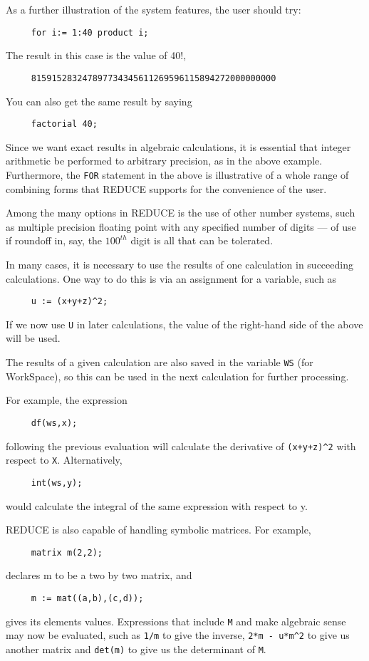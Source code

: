 \documentclass[11pt,letterpaper]{book}
\makeatletter
\newcommand{\REDUCE}{REDUCE}
\newcommand{\underscore}{\_}
\newcommand{\ttindex}[1]{{\renewcommand{\_}{\protect\underscore}%
                          \index{#1@{\tt #1}}}}
\makeatother
\begin{document}
As a further illustration of the system features, the user should try:
{\small\begin{verbatim}
     for i:= 1:40 product i;
\end{verbatim}}
The result in this case is the value of 40!,
{\small\begin{verbatim}
     815915283247897734345611269596115894272000000000
\end{verbatim}}
You can also get the same result by saying
{\small\begin{verbatim}
     factorial 40;
\end{verbatim}}
Since we want exact results in algebraic calculations, it is essential that
integer arithmetic be performed to arbitrary precision, as in the above
example. Furthermore, the {\tt FOR} statement in the above is illustrative of a
whole range of combining forms that {\REDUCE} supports for the convenience of
the user.

Among the many options in {\REDUCE} is the use of other number systems, such
as multiple precision floating point with any specified number of digits ---
of use if roundoff in, say, the $100^{th}$ digit is all that can be tolerated.

In many cases, it is necessary to use the results of one calculation in
succeeding calculations. One way to do this is via an assignment for a
variable, such as
{\small\begin{verbatim}
     u := (x+y+z)^2;
\end{verbatim}}
If we now use {\tt U} in later calculations, the value of the right-hand
side of the above will be used.

The results of a given calculation are also saved in the variable
{\tt WS}\ttindex{WS} (for WorkSpace), so this can be used in the next
calculation for further processing.

For example, the expression
{\small\begin{verbatim}
     df(ws,x);
\end{verbatim}}
following the previous evaluation will calculate the derivative of
{\tt (x+y+z)\verb|^|2} with respect to {\tt X}. Alternatively,
{\small\begin{verbatim}
     int(ws,y);
\end{verbatim}}
would calculate the integral of the same expression with respect to y.

{\REDUCE} is also capable of handling symbolic matrices. For example,
{\small\begin{verbatim}
     matrix m(2,2);
\end{verbatim}}
declares m to be a two by two matrix, and
{\small\begin{verbatim}
     m := mat((a,b),(c,d));
\end{verbatim}}
gives its elements values.  Expressions that include {\tt M} and make
algebraic sense may now be evaluated, such as {\tt 1/m} to give the
inverse, {\tt 2*m - u*m\verb|^|2} to give us another matrix and {\tt det(m)}
to give us the determinant of {\tt M}.
\end{document}
